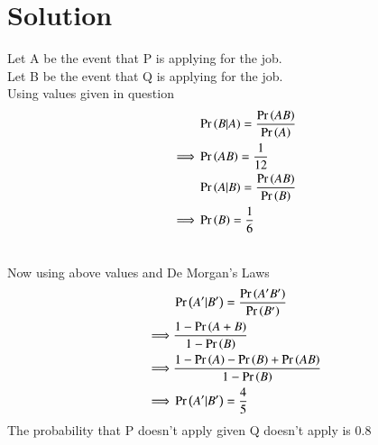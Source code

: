 \documentclass[journal,12pt,twocolumn]{IEEEtran}
\begin{document}
\section{Solution}
Let A be the event that P is applying for the job.\\
Let B be the event that Q is applying for the job.\\
Using values given in question
\begin{align}
    &\Pr\left(B|A\right)=\frac{\Pr\left(AB\right)}{\Pr\left(A\right)}\\
    \implies& \Pr\left(AB\right)=\frac{1}{12}\\
    &\Pr\left(A|B\right)=\frac{\Pr\left(AB\right)}{\Pr\left(B\right)}\\
    \implies& \Pr\left(B\right)=\frac{1}{6}
\end{align}
\begin{table}[ht]
\caption{Probability for random variables}
\centering
{}
\label{Tab:Tcr}
\end{table}
\\
Now using above values and De Morgan's Laws
\begin{align}
    &\Pr\left(A'|B'\right)=\frac{\Pr\left(A'B'\right)}{\Pr\left(B'\right)}\\
    \implies& \frac{1-\Pr\left(A + B\right)}{1-\Pr\left(B\right)}\\
    \implies& \frac{1-\Pr\left(A\right)-\Pr\left(B\right)+\Pr\left(AB\right)}{1-\Pr\left(B\right)}\\
    \implies& \Pr\left(A'|B'\right)=\frac{4}{5} 
\end{align}
The probability that P doesn't apply given Q doesn't apply is 0.8
\end{document}

